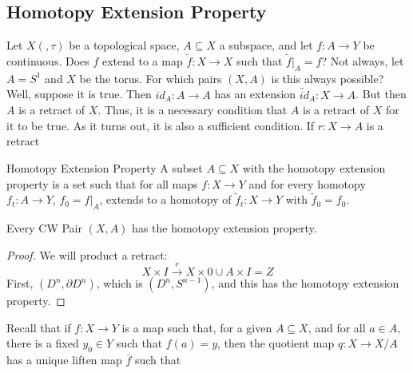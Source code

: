 \documentclass[crop=false,class=book,oneside]{standalone}
\begin{document}
        \subsection{Homotopy Extension Property}
            Let $X(,\tau)$ be a topological space,
            $A\subseteq{X}$ a subspace, and let
            $f:A\rightarrow{Y}$ be continuous. Does
            $f$ extend to a map $\tilde{f}:X\rightarrow{X}$
            such that $\tilde{f}|_{A}=f$? Not always, let
            $A=S^{1}$ and $X$ be the torus. For which pairs
            $(X,A)$ is this always possible? Well, suppose
            it is true. Then $id_{A}:A\rightarrow{A}$ has
            an extension $\tilde{id}_{A}:X\rightarrow{A}$.
            But then $A$ is a retract of $X$. Thus, it
            is a necessary condition that $A$ is a retract
            of $X$ for it to be true. As it turns out, it is
            also a sufficient condition. If
            $r:X\rightarrow{A}$ is a retract
            \begin{ldefinition}{Homotopy Extension Property}
                A subset $A\subseteq{X}$ with the homotopy
                extension property is a set such that for all
                maps $f:X\rightarrow{Y}$ and for every
                homotopy $f_{t}:A\rightarrow{Y}$,
                $f_{0}=f|_{A}$, extends to a homotopy of
                $\tilde{f}_{t}:X\rightarrow{Y}$ with
                $\tilde{f}_{0}=f_{0}$.
            \end{ldefinition}
            \begin{theorem}
                Every CW Pair $(X,A)$ has the homotopy
                extension property.
            \end{theorem}
            \begin{proof}
                We will product a retract:
                \begin{equation}
                    X\times{I}\overset{r}{\longrightarrow}
                        X\times{0}\cup{A}\times{I}=Z
                \end{equation}
                First, $(D^{n},\partial{D}^{n})$, which is
                $(D^{n},S^{n-1})$, and this has the
                homotopy extension property.
            \end{proof}
            Recall that if $f:X\rightarrow{Y}$ is a map such that,
            for a given $A\subseteq{X}$, and for all $a\in{A}$,
            there is a fixed $y_{0}\in{Y}$ such that $f(a)=y$, then
            the quotient map $q:X\rightarrow{X/A}$ has a unique
            liften map $\overline{f}$ such that
\end{document}
